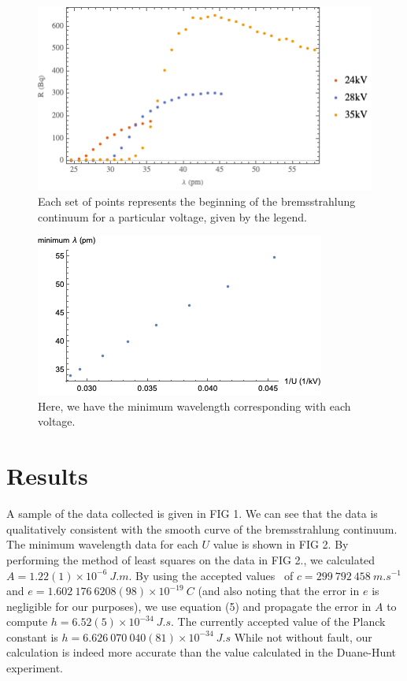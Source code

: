 \documentclass[aps,prl,preprint,groupedaddress]{revtex4-2}
\begin{document}
	\begin{figure}
		\includegraphics{rad_data.png}
		\caption{Each set of points represents the
		                beginning of the bremsstrahlung continuum for a particular voltage,
		                given by the legend.}
	\end{figure}
	\begin{figure}
		\includegraphics{min_wavelength.png}
		\caption{Here, we have the minimum wavelength 
		        corresponding with each voltage.}
	\end{figure}
\section{Results}
A sample of the data collected is given in FIG 1. We can see that the data is qualitatively consistent with the smooth curve of the bremsstrahlung continuum. The minimum wavelength data for each $U$ value is shown in FIG 2. By performing the method of least squares on the data in FIG 2., we calculated $A = 1.22(1) \times 10^{-6}~\si{J.m}$. By using the accepted values~\cite{mohr} of $c = 299~792~458~\si{m.s^{-1}}$ and $e = 1.602~176~6208(98) \times 10^{-19}~\si{C}$ (and also noting that the error in $e$ is negligible for our purposes), we use equation (5) and propagate the error in $A$ to compute $h = 6.52(5) \times 10^{-34}~\si{J.s}$. The currently accepted value of the Planck constant is $h = 6.626~070~040(81) \times 10^{-34}~\si{J.s}$ While not without fault, our calculation is indeed more accurate than the value calculated in the Duane-Hunt experiment.
\end{document}

